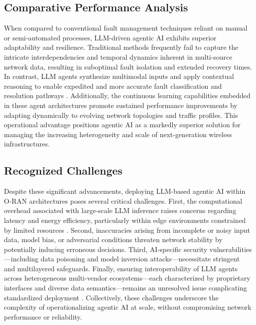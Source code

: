 \subsection{Comparative Performance Analysis}

When compared to conventional fault management techniques reliant on manual or semi-automated processes, LLM-driven agentic AI exhibits superior adaptability and resilience. Traditional methods frequently fail to capture the intricate interdependencies and temporal dynamics inherent in multi-source network data, resulting in suboptimal fault isolation and extended recovery times. In contrast, LLM agents synthesize multimodal inputs and apply contextual reasoning to enable expedited and more accurate fault classification and resolution pathways \cite{ref55}. Additionally, the continuous learning capabilities embedded in these agent architectures promote sustained performance improvements by adapting dynamically to evolving network topologies and traffic profiles. This operational advantage positions agentic AI as a markedly superior solution for managing the increasing heterogeneity and scale of next-generation wireless infrastructures.

\subsection{Recognized Challenges}

Despite these significant advancements, deploying LLM-based agentic AI within O-RAN architectures poses several critical challenges. First, the computational overhead associated with large-scale LLM inference raises concerns regarding latency and energy efficiency, particularly within edge environments constrained by limited resources \cite{ref55,ref48}. Second, inaccuracies arising from incomplete or noisy input data, model bias, or adversarial conditions threaten network stability by potentially inducing erroneous decisions. Third, AI-specific security vulnerabilities---including data poisoning and model inversion attacks---necessitate stringent and multilayered safeguards. Finally, ensuring interoperability of LLM agents across heterogeneous multi-vendor ecosystems---each characterized by proprietary interfaces and diverse data semantics---remains an unresolved issue complicating standardized deployment \cite{ref55,ref48}. Collectively, these challenges underscore the complexity of operationalizing agentic AI at scale, without compromising network performance or reliability.

